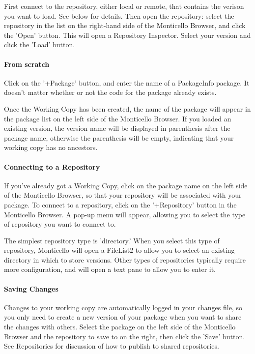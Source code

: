 First connect to the repository, either local or remote, that contains the verison you want to load. See below for details. Then open the repository: select the repository in the list on the right-hand side of the Monticello Browser, and click the 'Open' button. This will open a Repository Inspector. Select your version and click the 'Load' button.

\paragraph{From scratch}

Click on the '+Package' button, and enter the name of a PackageInfo package. It doesn't matter whether or not the code for the package already exists.

Once the Working Copy has been created, the name of the package will appear in the package list on the left side of the Monticello Browser. If you loaded an existing version, the version name will be displayed in parenthesis after the package name, otherwise the parenthesis will be empty, indicating that your working copy has no ancestors.

\paragraph{Connecting to a Repository}

If you've already got a Working Copy, click on the package name on the left side of the Monticello Browser, so that your repository will be associated with your package. To connect to a repository, click on the '+Repository' button in the Monticello Browser. A pop-up menu will appear, allowing you to select the type of repository you want to connect to.

The simplest repository type is 'directory.' When you select this type of repository, Monticello will open a FileList2 to allow you to select an existing directory in which to store versions. Other types of repositories typically require more configuration, and will open a text pane to allow you to enter it.

\paragraph{Saving Changes}

Changes to your working copy are automatically logged in your changes file, so you only need to create a new version of your package when you want to share the changes with others. Select the package on the left side of the Monticello Browser and the repository to save to on the right, then click the 'Save' button. See Repositories for discussion of how to publish to shared repositories.

